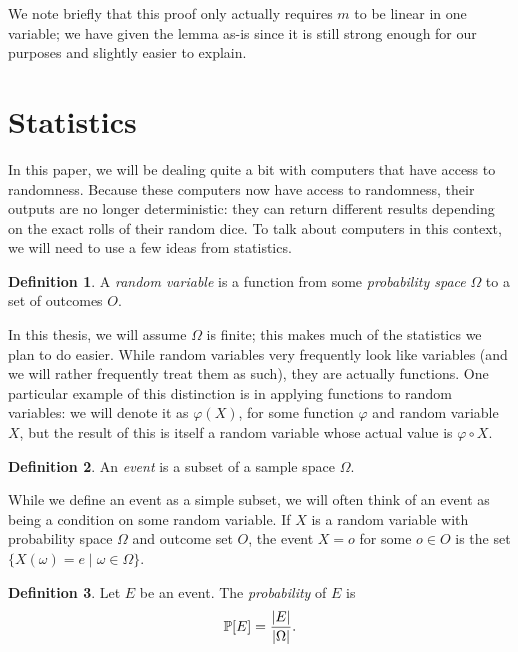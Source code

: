 \documentclass[english,12pt]{reedthesis}
\theoremstyle{plain}
\theoremstyle{definition}
\newtheorem{defn}[defn]{Definition}
\theoremstyle{remark}
\DeclarePairedDelimiter{\abs}{\lvert}{\rvert}
\begin{document}
We note briefly that this proof only actually requires $m$ to be linear in one
variable; we have given the lemma as-is since it is still strong enough for our
purposes and slightly easier to explain.

\section{Statistics}\label{sec:statistics}

In this paper, we will be dealing quite a bit with computers that have access to
randomness. Because these computers now have access to randomness, their outputs
are no longer deterministic: they can return different results depending on the
exact rolls of their random dice. To talk about computers in this context, we
will need to use a few ideas from statistics.

\begin{defn}\label{def:random-var}
  A \emph{random variable} is a function from some \emph{probability space} $\Omega$
  to a set of outcomes $O$.
\end{defn}

In this thesis, we will assume $\Omega$ is finite; this makes much of the statistics
we plan to do easier. While random variables very frequently look like variables
(and we will rather frequently treat them as such), they are actually functions.
One particular example of this distinction is in applying functions to random
variables: we will denote it as $\varphi(X)$, for some function $\varphi$ and random
variable $X$, but the result of this is itself a random variable whose actual
value is $\varphi \circ X$.

\begin{defn}\label{def:event}
  An \emph{event} is a subset of a sample space $\Omega$.
\end{defn}

While we define an event as a simple subset, we will often think of an event as
being a condition on some random variable. If $X$ is a random variable with
probability space $\Omega$ and outcome set $O$, the event $X = o$ for some $o \in O$ is
the set $\{X(\omega) = e \mid \omega \in \Omega\}$.

\begin{defn}\label{def:probability}
  Let $E$ be an event. The \emph{probability} of $E$ is
  \begin{equation*}
    \mathbb{P}[E] = \frac{\abs{E}}{\abs{\Omega}}.
  \end{equation*}
\end{defn}
\end{document}
